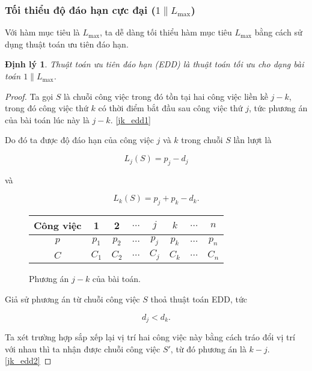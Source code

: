 \documentclass[12pt,a4paper]{report}
\newtheorem{dl}{Định lý}
\begin{document}
\subsubsection*{Tối thiểu độ đáo hạn cực đại ($1 \| L_{\max}$)}
Với hàm mục tiêu là $L_{\max}$, ta dễ dàng tối thiểu hàm mục tiêu $L_{\max}$ bằng cách sử dụng thuật toán ưu tiên đáo hạn.

\begin{dl}
	Thuật toán ưu tiên đáo hạn (EDD) là thuật toán tối ưu cho dạng bài toán $1 \| L_{\max}$.
\end{dl}

\begin{proof}

	Ta gọi $S$ là chuỗi công việc trong đó tồn tại hai công việc liền kề $j - k$, trong đó công việc thứ $k$ có thời điểm bắt đầu sau công việc thứ $j$, tức phương án của bài toán lúc này là $j - k$. \eqref{jk_edd1}
	
	Do đó ta được độ đáo hạn của công việc $j$ và $k$ trong chuỗi $S$ lần lượt là

	\begin{equation} \label{LjS}
		L_j(S) = p_j - d_j
	\end{equation}

	và

	\begin{equation} \label{LkS}
		L_k(S) = p_j + p_k - d_k.
	\end{equation}

	\begin{figure}[h!]
		\centering
		 \begin{tabular}{|c | c c c c c c c |} 
		 \hline
		 Công việc & 1 & 2 & $\ldots$ & $j$ & $k$ & $\ldots$ & $n$ \\
		 \hline\hline
		 $p$ & $p_1$ & $p_2$ & $\ldots$ & $p_j$ & $p_k$ & $\ldots$ & $p_n$ \\
		 $C$ & $C_1$ & $C_2$ & $\ldots$ & $C_j$ & $C_k$ & $\ldots$ & $C_n$ \\
		 \hline
		 \end{tabular}
	\caption{\label{jk_edd1}Phương án $j - k$ của bài toán.}
	\end{figure}

	Giả sử phương án từ chuỗi công việc $S$ thoả thuật toán EDD, tức

	\begin{equation} \label{dj<dk}
		d_j < d_k.
	\end{equation}

	Ta xét trường hợp sắp xếp lại vị trí hai công việc này bằng cách tráo đổi vị trí với nhau thì ta nhận được chuỗi công việc $S'$, từ đó phương án là $k - j$. \eqref{jk_edd2}


\end{proof}
\end{document}

